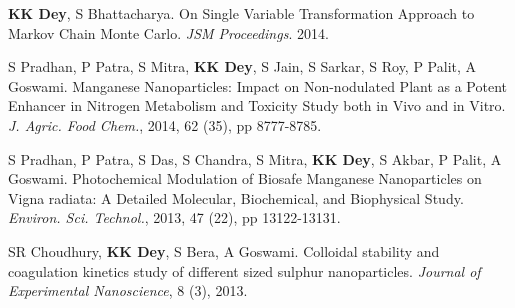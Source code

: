 \documentclass[margin,line]{res}
\begin{document}
\begin{resume}
\begin{enumerate}
{\item \textbf{KK Dey}, S Bhattacharya. On Single Variable Transformation Approach to Markov Chain Monte Carlo. \textit{JSM Proceedings}. 2014.  

\item S Pradhan, P Patra, S Mitra, \textbf{KK Dey}, S Jain, S Sarkar, S Roy, P Palit, A Goswami. Manganese Nanoparticles: Impact on Non-nodulated Plant as a Potent Enhancer in Nitrogen Metabolism and Toxicity Study both in Vivo and in Vitro. \textit{J. Agric. Food Chem.}, 2014, 62 (35), pp 8777-8785. 

\item S Pradhan, P Patra, S Das, S Chandra, S Mitra, \textbf{KK Dey}, S Akbar, P Palit, A Goswami. Photochemical Modulation of Biosafe Manganese Nanoparticles on Vigna radiata: A Detailed Molecular, Biochemical, and Biophysical Study.  \textit{Environ. Sci. Technol.}, 2013, 47 (22), pp 13122-13131.

\item SR Choudhury,  \textbf{KK Dey}, S Bera, A Goswami. Colloidal stability and coagulation kinetics study of different sized sulphur nanoparticles. \textit{Journal of Experimental Nanoscience}, 8 (3), 2013. 
}
\end{enumerate}


\end{resume}
\end{document}
